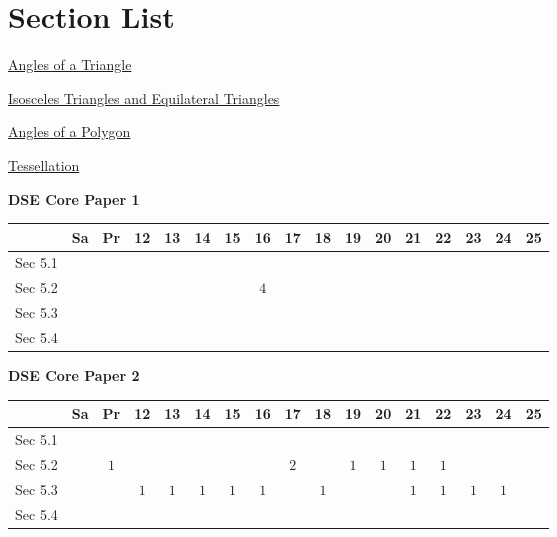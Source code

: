 \documentclass[12pt, a4paper]{article}
\begin{document}
\section*{Section List}
\begin{enumx}[label=Sec 5.\arabic*\ ]
\item \hyperref[section:2-5-1]{Angles of a Triangle}
\item \hyperref[section:2-5-2]{Isosceles Triangles and Equilateral Triangles}
\item \hyperref[section:2-5-3]{Angles of a Polygon}
\item \hyperref[section:2-5-4]{Tessellation}
\end{enumx}
\begin{absolutelynopagebreak}
\begin{center}
\textbf{DSE Core Paper 1}
\end{center}
\begin{center}
\begin{tabular}{|l|c|c|c|c|c|c|c|c|c|c|c|c|c|c|c|c|}
\hline
        & Sa & Pr & 12 & 13 & 14 & 15 & 16 & 17 & 18 & 19 & 20 & 21 & 22 & 23 & 24 & 25 \\\hline\hline
Sec 5.1 &  &  &  &  &  &  &  &  &  &  &  &  &  &  &  &  \\\hline
Sec 5.2 &  &  &  &  &  &  &  $4$ &  &  &  &  &  &  &  &  &  \\\hline
Sec 5.3 &  &  &  &  &  &  &  &  &  &  &  &  &  &  &  &  \\\hline
Sec 5.4 &  &  &  &  &  &  &  &  &  &  &  &  &  &  &  &  \\\hline
\end{tabular}
\end{center}
\end{absolutelynopagebreak}
\begin{absolutelynopagebreak}
\begin{center}
\textbf{DSE Core Paper 2}
\end{center}
\begin{center}
\begin{tabular}{|l|c|c|c|c|c|c|c|c|c|c|c|c|c|c|c|c|}
\hline
        & Sa & Pr & 12 & 13 & 14 & 15 & 16 & 17 & 18 & 19 & 20 & 21 & 22 & 23 & 24 & 25 \\\hline\hline
Sec 5.1 &  &  &  &  &  &  &  &  &  &  &  &  &  &  &  &  \\\hline
Sec 5.2 &  &  $1$ &  &  &  &  &  &  $2$ &  &  $1$ &  $1$ &  $1$ &  $1$ &  &  &  \\\hline
Sec 5.3 &  &  &  $1$ &  $1$ &  $1$ &  $1$ &  $1$ &  &  $1$ &  &  &  $1$ &  $1$ &  $1$ &  $1$ &  \\\hline
Sec 5.4 &  &  &  &  &  &  &  &  &  &  &  &  &  &  &  &  \\\hline
\end{tabular}
\end{center}
\end{absolutelynopagebreak}
\end{document}
